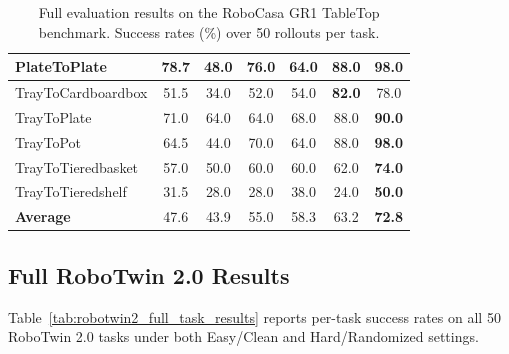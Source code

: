 \documentclass{llmxive}
\begin{document}
\begin{table}[tp]
\begin{tabular*}{\textwidth}{@{\extracolsep{\fill}}lcccccc}
PlateToPlate               & 78.7 & 48.0 & 76.0 & 64.0 & 88.0 & \textbf{98.0} \\
\hline
TrayToCardboardbox         & 51.5 & 34.0 & 52.0 & 54.0 & \textbf{82.0} & 78.0 \\
TrayToPlate                & 71.0 & 64.0 & 64.0 & 68.0 & 88.0 & \textbf{90.0} \\
TrayToPot                  & 64.5 & 44.0 & 70.0 & 64.0 & 88.0 & \textbf{98.0} \\
TrayToTieredbasket         & 57.0 & 50.0 & 60.0 & 60.0 & 62.0 & \textbf{74.0} \\
TrayToTieredshelf          & 31.5 & 28.0 & 28.0 & 38.0 & 24.0 & \textbf{50.0} \\
\hline
\textbf{Average}           & 47.6 & 43.9 & 55.0 & 58.3 & 63.2 & \textbf{72.8} \\
\hline
\end{tabular*}
\caption{Full evaluation results on the RoboCasa GR1 TableTop benchmark. Success rates (\%) over 50 rollouts per task.}
\label{tab:robocasa_full_results}
\end{table}

\subsection{Full RoboTwin 2.0 Results}
\label{app:full-robotwin-results}

Table~\ref{tab:robotwin2_full_task_results} reports per-task success rates on all 50 RoboTwin 2.0
tasks under both Easy/Clean and Hard/Randomized settings.
\end{document}
